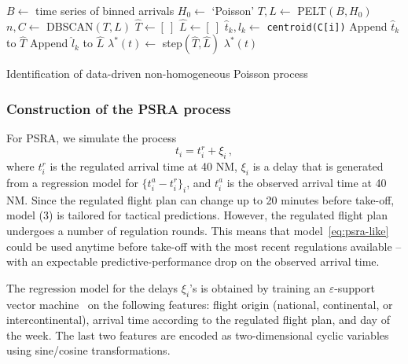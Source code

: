 \documentclass[final,review]{elsarticle}
\begin{document}
\begin{algorithm}
\begin{algorithmic}[1]
    \STATE \(B \leftarrow \) time series of binned arrivals
    \STATE \(H_0 \leftarrow \) `Poisson'
    \STATE \(T, L \leftarrow \) PELT\((B, H_0)\)
    \STATE \(n, C \leftarrow \) DBSCAN\((T, L)\)
    \STATE {}
    \STATE \(\hat{T} \leftarrow [~] \)
    \STATE \(\hat{L} \leftarrow [~] \)
        \STATE \(\hat{t}_k, \hat{l}_k \leftarrow \) \texttt{centroid(C[i])}
        \STATE Append \(\hat{t}_k\) to \(\hat{T}\)
        \STATE Append \(\hat{l}_k\) to \(\hat{L}\)
    \ENDFOR
    \STATE \(\lambda^\ast(t) \leftarrow \) step\((\hat{T}, \hat{L})\)
    \RETURN \(\lambda^\ast(t)\)
\end{algorithmic}
\caption{Identification of data-driven non-homogeneous Poisson process}\label{Alg:POISSON}
\end{algorithm}

\subsubsection{Construction of the \acs{PSRA} process}\label{sec:dm_psra}

For \ac{PSRA}, we simulate the process
\begin{equation}
\label{eq:psra-like}
t_i = t^{r}_i + \xi_i \,,
\end{equation}
where \(t^{r}_i\) is the regulated arrival time at 40 NM, \(\xi_i\) is a delay that is generated from a regression model for \(\{t^{a}_i - t^{r}_i\}_i\), and \(t^{a}_i\) is the observed arrival time at 40 NM.
Since the regulated flight plan can change up to 20 minutes before take-off, model (3) is tailored for tactical predictions. However, the regulated flight plan undergoes a number of regulation rounds.
This means that model~\eqref{eq:psra-like} could be used anytime before take-off with the most recent regulations available -- with an expectable predictive-performance drop on the observed arrival time.

The regression model for the delays \(\xi_i\)'s is obtained by training an \(\varepsilon\)-support vector machine~\citep{cristianini2000introduction} on the following features: flight origin (national, continental, or intercontinental), arrival time according to the regulated flight plan, and day of the week.
The last two features are encoded as two-dimensional cyclic variables using sine/cosine transformations.
\end{document}
